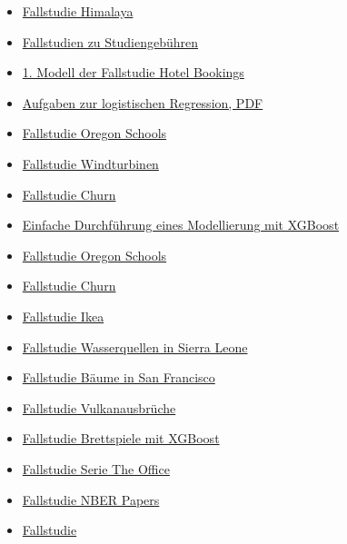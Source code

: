 \documentclass[
  letterpaper,
  DIV=11,
  numbers=noendperiod]{scrreprt}
\theoremstyle{definition}
\theoremstyle{definition}
\theoremstyle{remark}
\begin{document}
\begin{itemize}
{  zu Vulkanausbrüchen}
\item
  \href{https://juliasilge.com/blog/himalayan-climbing/}{Fallstudie
  Himalaya}
\item
  \href{https://juliasilge.com/blog/tuition-resampling/}{Fallstudien zu
  Studiengebühren}
\item
  \href{https://www.tidymodels.org/start/case-study/}{1. Modell der
  Fallstudie Hotel Bookings}
\item
  \href{https://github.com/sebastiansauer/datascience1/blob/main/Aufgaben/Thema8-Loesungen1.pdf}{Aufgaben
  zur logistischen Regression, PDF}
\item
  \href{https://bcullen.rbind.io/post/2020-06-02-tidymodels-decision-tree-learning-in-r/}{Fallstudie
  Oregon Schools}
\item
  \href{https://juliasilge.com/blog/wind-turbine/}{Fallstudie
  Windturbinen}
\item
  \href{https://www.gmudatamining.com/lesson-13-r-tutorial.html}{Fallstudie
  Churn}
\item
  \href{https://data-se.netlify.app/2020/12/14/titanic-tidymodels-boost/}{Einfache
  Durchführung eines Modellierung mit XGBoost}
\item
  \href{https://bcullen.rbind.io/post/2020-06-02-tidymodels-decision-tree-learning-in-r/}{Fallstudie
  Oregon Schools}
\item
  \href{https://www.gmudatamining.com/lesson-13-r-tutorial.html}{Fallstudie
  Churn}
\item
  \href{https://juliasilge.com/blog/ikea-prices/}{Fallstudie Ikea}
\item
  \href{https://juliasilge.com/blog/water-sources/}{Fallstudie
  Wasserquellen in Sierra Leone}
\item
  \href{https://dev.to/juliasilge/tuning-random-forest-hyperparameters-in-r-with-tidytuesday-trees-data-4ilh}{Fallstudie
  Bäume in San Francisco}
\item
  \href{https://juliasilge.com/blog/multinomial-volcano-eruptions/}{Fallstudie
  Vulkanausbrüche}
\item
  \href{https://juliasilge.com/blog/board-games/}{Fallstudie Brettspiele
  mit XGBoost}
\item
  \href{https://juliasilge.com/blog/lasso-the-office/}{Fallstudie Serie
  The Office}
\item
  \href{https://juliasilge.com/blog/nber-papers/}{Fallstudie NBER
  Papers}
\item
  \href{https://www.kaggle.com/ssauer/simple-linear-model-tidymodels}{Fallstudie
}
\end{itemize}
\end{document}
